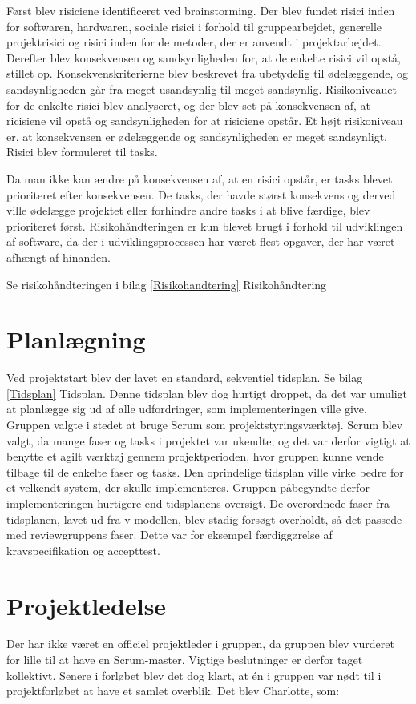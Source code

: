 Først blev risiciene identificeret ved brainstorming. Der blev fundet risici inden for softwaren, hardwaren, sociale risici i forhold til gruppearbejdet, generelle projektrisici og risici inden for de metoder, der er anvendt i projektarbejdet. Derefter blev konsekvensen og sandsynligheden for, at de enkelte risici vil opstå, stillet op. Konsekvenskriterierne blev beskrevet fra ubetydelig til ødelæggende, og sandsynligheden går fra meget usandsynlig til meget sandsynlig. Risikoniveauet for de enkelte risici blev analyseret, og der blev set på konsekvensen af, at ricisiene vil opstå og sandsynligheden for at risiciene opstår. Et højt risikoniveau er, at konsekvensen er ødelæggende og sandsynligheden er meget sandsynligt. Risici blev formuleret til tasks. 

Da man ikke kan ændre på konsekvensen af, at en risici opstår, er tasks blevet prioriteret efter konsekvensen. De tasks, der havde størst konsekvens og derved ville ødelægge projektet eller forhindre andre tasks i at blive færdige, blev prioriteret først. Risikohåndteringen er kun blevet brugt i forhold til udviklingen af software, da der i udviklingsprocessen har været flest opgaver, der har været afhængt af hinanden.

Se risikohåndteringen i bilag \ref{Risikohandtering} Risikohåndtering

\section{Planlægning}
Ved projektstart blev der lavet en standard, sekventiel tidsplan. Se bilag \ref{Tidsplan} Tidsplan. Denne tidsplan blev dog hurtigt droppet, da det var umuligt at planlægge sig ud af alle udfordringer, som implementeringen ville give. Gruppen valgte i stedet at bruge Scrum som projektstyringsværktøj. Scrum blev valgt, da mange faser og tasks i projektet var ukendte, og det var derfor vigtigt at benytte et agilt værktøj gennem projektperioden, hvor gruppen kunne vende tilbage til de enkelte faser og tasks. Den oprindelige tidsplan ville virke bedre for et velkendt system, der skulle implementeres. Gruppen påbegyndte derfor implementeringen hurtigere end tidsplanens oversigt. De overordnede faser fra tidsplanen, lavet ud fra v-modellen, blev stadig forsøgt overholdt, så det passede med reviewgruppens faser. Dette var for eksempel færdiggørelse af kravspecifikation og accepttest. 

\section{Projektledelse}
Der har ikke været en officiel projektleder i gruppen, da gruppen blev vurderet for lille til at have en Scrum-master. Vigtige beslutninger er derfor taget kollektivt. Senere i forløbet blev det dog klart, at én i gruppen var nødt til i projektforløbet at have et samlet overblik. Det blev Charlotte, som: 

